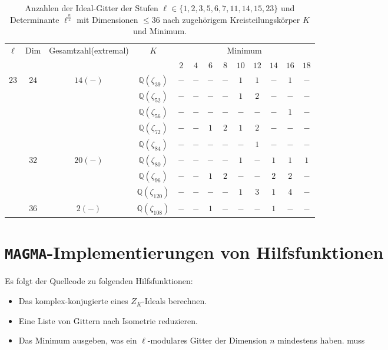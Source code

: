 \documentclass[12pt,a4paper,halfparskip,headsepline,bibtotocnumbered]{scrreprt}
\theoremstyle{nummermitklammern}
\theoremstyle{nonumberbreak}
\newcommand{\Q}{\mathbb{Q}}
\begin{document}
\begin{table}
	\centering
	\begin{tabular}{|c|c|c|c|c|c|c|c|c|c|c|c|c|}
		\hline		
		\multirow{2}{*}{$\ell$}	&\multirow{2}{*}{Dim}	&\multirow{2}{*}{Gesamtzahl(extremal)}	&\multirow{2}{*}{$K$}	&\multicolumn{9}{c|}{Minimum}\\ \cline{5-13}
								&						&							&					&$2$	&$4$	&$6$	&$8$	&$10$	&$12$	&$14$	&$16$	&$18$\\ \hline
		\multirow{9}{*}{$23$}	&\multirow{5}{*}{$24$}	&\multirow{5}{*}{$14(-)$}	&$\Q(\zeta_{39})$	&$-$	&$-$	&$-$	&$-$	&$1$	&$1$	&$-$	&$1$	&$-$\\ \cline{4-13}
								&						&							&$\Q(\zeta_{52})$	&$-$	&$-$	&$-$	&$-$	&$1$	&$2$	&$-$	&$-$	&$-$\\ \cline{4-13}
								&						&							&$\Q(\zeta_{56})$	&$-$	&$-$	&$-$	&$-$	&$-$	&$-$	&$-$	&$1$	&$-$\\ \cline{4-13}
								&						&							&$\Q(\zeta_{72})$	&$-$	&$-$	&$1$	&$2$	&$1$	&$2$	&$-$	&$-$	&$-$\\ \cline{4-13}
								&						&							&$\Q(\zeta_{84})$	&$-$	&$-$	&$-$	&$-$	&$-$	&$1$	&$-$	&$-$	&$-$\\ \cline{2-13}
								&\multirow{3}{*}{$32$}	&\multirow{3}{*}{$20(-)$}	&$\Q(\zeta_{80})$	&$-$	&$-$	&$-$	&$-$	&$1$	&$-$	&$1$	&$1$	&$1$\\ \cline{4-13}
								&						&							&$\Q(\zeta_{96})$	&$-$	&$-$	&$1$	&$2$	&$-$	&$-$	&$2$	&$2$	&$-$\\ \cline{4-13}
								&						&							&$\Q(\zeta_{120})$	&$-$	&$-$	&$-$	&$-$	&$1$	&$3$	&$1$	&$4$	&$-$\\ \cline{2-13}
								&$36$					&$2(-)$						&$\Q(\zeta_{108})$	&$-$	&$-$	&$1$	&$-$	&$-$	&$-$	&$1$	&$-$	&$-$\\ \hline
	\end{tabular}
	\caption{Anzahlen der Ideal-Gitter der Stufen $\ell \in \lbrace 1,2,3,5,6,7,11,14,15,23 \rbrace$ und Determinante $\ell^\frac{n}{2}$ mit Dimensionen $\leq 36$ nach zugehörigem Kreisteilungskörper $K$ und Minimum.}
\end{table}

\section{\texttt{MAGMA}-Implementierungen von Hilfsfunktionen}
Es folgt der Quellcode zu folgenden Hilfsfunktionen:
\begin{itemize}
	\item Das komplex-konjugierte eines $Z_K$-Ideals berechnen.
	\item Eine Liste von Gittern nach Isometrie reduzieren.
	\item Das Minimum ausgeben, was ein $\ell$-modulares Gitter der Dimension $n$ mindestens haben. muss
\end{itemize}

\end{document}
